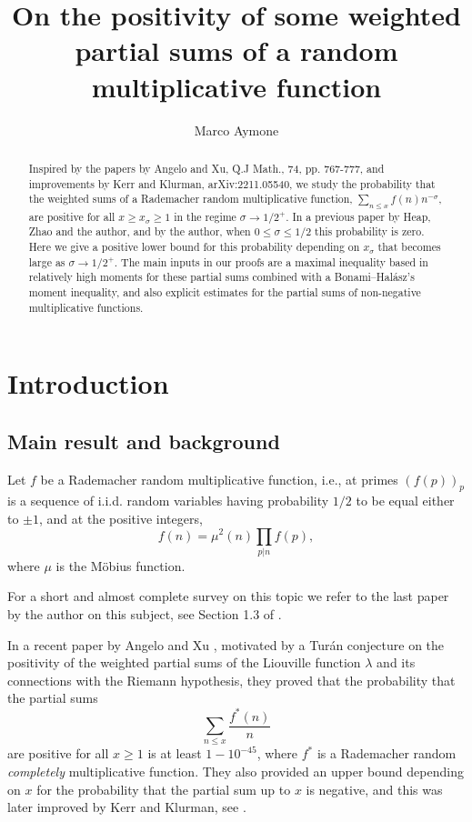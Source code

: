 \documentclass[reqno0,12pt]{amsart}
\theoremstyle{remark}
\begin{document}
\title{On the positivity of some weighted partial sums of a random multiplicative function}
\author{Marco Aymone}
\begin{abstract}
Inspired by the papers by Angelo and Xu, Q.J Math., 74, pp. 767-777, and improvements by Kerr and Klurman, arXiv:2211.05540,  we study the probability that the weighted sums of a Rademacher random multiplicative function,
$\sum_{n\leq x}f(n)n^{-\sigma}$, are positive for all $x\geq x_\sigma\geq 1$ in the regime $\sigma\to1/2^+$. In a previous paper by Heap, Zhao and the author, and by the author, when $0\leq \sigma\leq 1/2$ this probability is zero. Here we give a positive lower bound for this probability depending on $x_\sigma$ that becomes large as $\sigma\to1/2^+$. The main inputs in our proofs are a maximal inequality based in relatively high moments for these partial sums combined with a Bonami--Halász's moment inequality, and also explicit estimates for the partial sums of non-negative multiplicative functions.  
\end{abstract}
\maketitle
\section{Introduction}
\subsection{Main result and background} Let $f$ be a Rademacher random multiplicative function, i.e., at primes $(f(p))_p$ is a sequence of i.i.d. random variables having probability $1/2$ to be equal either to $\pm 1$, and at the positive integers,
$$f(n)=\mu^2(n)\prod_{p|n}f(p),$$
where $\mu$ is the M\"obius function. 

For a short and almost complete survey on this topic we refer to the last paper by the author on this subject, see Section 1.3 of \cite{aymone_sign_changes_II}.

In a recent paper by Angelo and Xu \cite{angelo_xu_positivity}, motivated by a Turán conjecture on the positivity of the weighted partial sums of the Liouville function $\lambda$ and its connections with the Riemann hypothesis, they proved that the probability that the partial sums
$$\sum_{n\leq x}\frac{f^*(n)}{n}$$
are positive for all $x\geq 1$ is at least $1-10^{-45}$, where $f^*$ is a Rademacher random \textit{completely} multiplicative function. They also provided an upper bound depending on $x$ for the probability that the partial sum up to $x$ is negative, and this was later improved by Kerr and Klurman, see \cite{klurman_positivity}.
\end{document}
